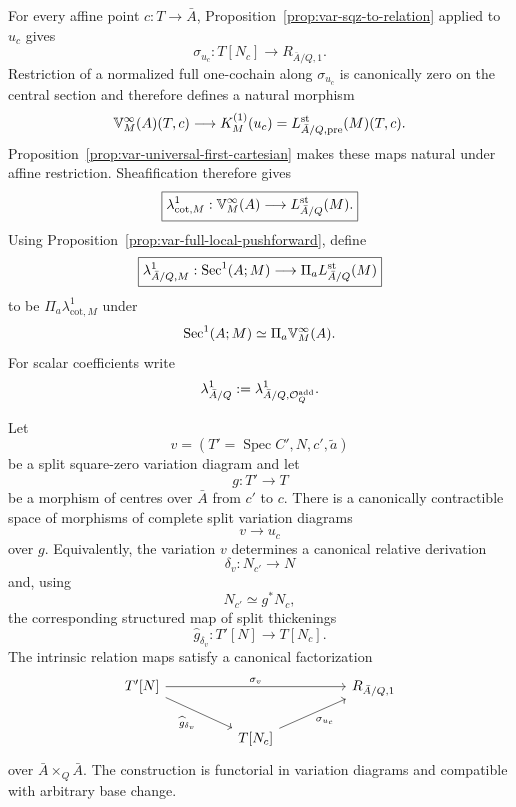 \begin{construction}
\label{con:var-coeff-cotangent-restriction}
For every affine point \(c:T\to\bar A\), Proposition~\ref{prop:var-sqz-to-relation} applied to \(u_c\) gives
\[
    \sigma_{u_c}:T[N_c]\longrightarrow R_{\bar A/Q,1}.
\]
Restriction of a normalized full one-cochain along \(\sigma_{u_c}\) is canonically zero on the central section and therefore defines a natural morphism
\[
    \mathbb V^{\infty}_M(A)(T,c)
    \longrightarrow
    K_M^{(1)}(u_c)
    =
    L^{\mathrm{st}}_{\bar A/Q,\mathrm{pre}}(M)(T,c).
\]
Proposition~\ref{prop:var-universal-first-cartesian} makes these maps natural under affine restriction. Sheafification therefore gives
\[
    \boxed{
    \lambda^1_{\mathrm{cot},M}:
    \mathbb V^{\infty}_M(A)
    \longrightarrow
    L^{\mathrm{st}}_{\bar A/Q}(M).
    }
\]
Using Proposition~\ref{prop:var-full-local-pushforward}, define
\[
    \boxed{
    \lambda^1_{\bar A/Q,M}:
    \operatorname{Sec}^1(A;M)
    \longrightarrow
    \Pi_aL^{\mathrm{st}}_{\bar A/Q}(M)
    }
\]
to be \(\Pi_a\lambda^1_{\mathrm{cot},M}\) under
\[
    \operatorname{Sec}^1(A;M)\simeq\Pi_a\mathbb V^{\infty}_M(A).
\]
For scalar coefficients write
\[
    \lambda^1_{\bar A/Q}:=
    \lambda^1_{\bar A/Q,\mathcal O^{\mathrm{add}}_Q}.
\]
\end{construction}

\begin{theorem}
\label{thm:var-sqz-factor-first-neighbourhood}
Let
\[
    v=(T'=\operatorname{Spec}C',N,c',\widetilde a)
\]
be a split square-zero variation diagram and let
\[
    g:T'\longrightarrow T
\]
be a morphism of centres over \(\bar A\) from \(c'\) to \(c\). There is a canonically contractible space of morphisms of complete split variation diagrams
\[
    \boxed{
    v\longrightarrow u_c
    }
\]
over \(g\). Equivalently, the variation \(v\) determines a canonical relative derivation
\[
    \delta_v:
    N_{c'}
    \longrightarrow
    N
\]
and, using
\[
    N_{c'}\simeq g^*N_c,
\]
the corresponding structured map of split thickenings
\[
    \widehat g_{\delta_v}:
    T'[N]\longrightarrow T[N_c].
\]
The intrinsic relation maps satisfy a canonical factorization
\[
\begin{tikzcd}[column sep=huge]
T'[N]
  \arrow[rr,"\sigma_v"]
  \arrow[dr,"\widehat g_{\delta_v}"']
&& R_{\bar A/Q,1}
\\
& T[N_c]
  \arrow[ur,"\sigma_{u_c}"'] &
\end{tikzcd}
\]
over \(\bar A\times_Q\bar A\). The construction is functorial in variation diagrams and compatible with arbitrary base change.
\end{theorem}

